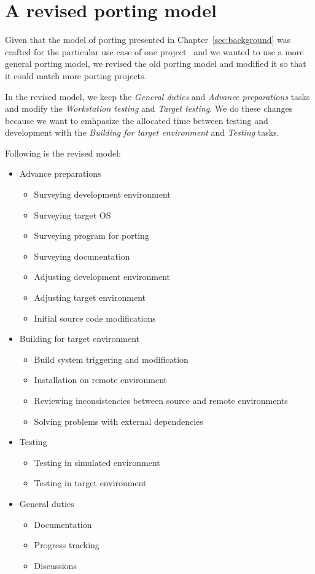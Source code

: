 \chapter{A revised porting model} \label{sec:revised-porting-model}

Given that the model of porting presented in Chapter~\ref{sec:background} was
crafted for the particular use case of one project~\cite{tanaka} and we wanted
to use a more general porting model, we revised the old porting model and
modified it so that it could match more porting projects.

In the revised model, we keep the \textit{General duties} and \textit{Advance
preparations} tasks and modify the \textit{Workstation testing} and
\textit{Target testing}. We do these changes because we want to emhpasize the
allocated time between testing and development with the \textit{Building for
target environment} and \textit{Testing} tasks.

Following is the revised model:
\begin{itemize}
    \item Advance preparations
        \begin{itemize}
            \item Surveying development environment
            \item Surveying target OS
            \item Surveying program for porting
            \item Surveying documentation
            \item Adjusting development environment
            \item Adjusting target environment
            \item Initial source code modifications
        \end{itemize}
    \item Building for target environment
        \begin{itemize}
            \item Build system triggering and modification
            \item Installation on remote environment
            \item Reviewing inconsistencies between source and remote
            environments
            \item Solving problems with external dependencies
        \end{itemize}
    \item Testing
        \begin{itemize}
            \item Testing in simulated environment
            \item Testing in target environment
        \end{itemize}
    \item General duties
        \begin{itemize}
            \item Documentation
            \item Progress tracking
            \item Discussions
        \end{itemize}
\end{itemize}

